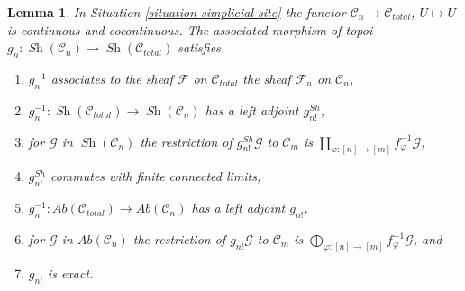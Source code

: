 \documentclass{stacks-project}
\theoremstyle{plain}
\newtheorem{lemma}[subsection]{Lemma}
\theoremstyle{definition}
\theoremstyle{remark}
\numberwithin{equation}{subsection}
\def\Sh{\mathop{\mathit{Sh}}\nolimits}
\begin{document}
\begin{lemma}
\label{lemma-restriction-to-components-site}
In Situation \ref{situation-simplicial-site} the functor
$\mathcal{C}_n \to \mathcal{C}_{total}$, $U \mapsto U$ is continuous
and cocontinuous. The associated morphism of
topoi $g_n : \Sh(\mathcal{C}_n) \to \Sh(\mathcal{C}_{total})$ satisfies
\begin{enumerate}
\item $g_n^{-1}$ associates to the sheaf $\mathcal{F}$ on $\mathcal{C}_{total}$
the sheaf $\mathcal{F}_n$ on $\mathcal{C}_n$,
\item $g_n^{-1} : \Sh(\mathcal{C}_{total}) \to \Sh(\mathcal{C}_n)$
has a left adjoint $g^{Sh}_{n!}$,
\item for $\mathcal{G}$ in $\Sh(\mathcal{C}_n)$ the restriction of
$g_{n!}^{Sh}\mathcal{G}$ to $\mathcal{C}_m$ is
$\coprod\nolimits_{\varphi : [n] \to [m]} f_\varphi^{-1}\mathcal{G}$,
\item $g_{n!}^{Sh}$ commutes with finite connected limits,
\item $g_n^{-1} : \textit{Ab}(\mathcal{C}_{total}) \to
\textit{Ab}(\mathcal{C}_n)$ has a left adjoint $g_{n!}$,
\item for $\mathcal{G}$ in $\textit{Ab}(\mathcal{C}_n)$ the restriction of
$g_{n!}\mathcal{G}$ to $\mathcal{C}_m$ is
$\bigoplus\nolimits_{\varphi : [n] \to [m]} f_\varphi^{-1}\mathcal{G}$, and
\item $g_{n!}$ is exact.
\end{enumerate}
\end{lemma}
\end{document}
